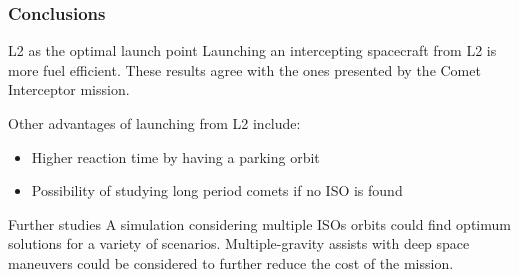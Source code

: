 \documentclass[xcolor={dvipsnames}]{beamer}
\begin{document}
\begin{frame}
\frametitle{Conclusions}

\begin{block}{L2 as the optimal launch point}
Launching an intercepting spacecraft from L2 is more fuel efficient. These
results agree with the ones presented by the Comet Interceptor mission.
\end{block}

\pause

\vspace{0.25cm}
Other advantages of launching from L2 include:

\vspace{0.25cm}
\begin{itemize}
    \item Higher reaction time by having a parking orbit
    \item Possibility of studying long period comets if no ISO is found
\end{itemize}

\vspace{0.25cm}
\pause

\begin{alertblock}{Further studies}
A simulation considering multiple ISOs orbits could find optimum solutions for a
variety of scenarios. Multiple-gravity assists with deep space maneuvers
could be considered to further reduce the cost of the mission.
\end{alertblock}

\end{frame}
\end{document}
